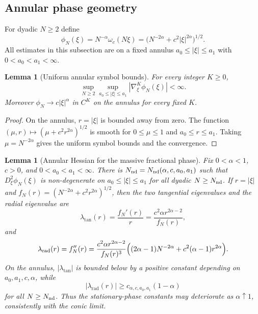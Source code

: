 \documentclass[10pt]{amsart}
\numberwithin{equation}{section}
\theoremstyle{plain}
\newtheorem{lemma}[theorem]{Lemma}
\theoremstyle{definition}
\theoremstyle{remark}
\begin{document}
\subsection{Annular phase geometry}

For dyadic $N\ge2$ define
\begin{equation}\label{eq:fracKG-rescaled-phase}
        \phi_N(\xi)=N^{-\alpha}\omega_c(N\xi)
        =\bigl(N^{-2\alpha}+c^2|\xi|^{2\alpha}\bigr)^{1/2}.
\end{equation}
All estimates in this subsection are on a fixed annulus $a_0\le |\xi|\le a_1$ with $0<a_0<a_1<\infty$.

\begin{lemma}[Uniform annular symbol bounds]\label{lem:fracKG-symbol-bounds}
For every integer $K\ge0$,
\[
        \sup_{N\ge2}\sup_{a_0\le |\xi|\le a_1}
        |\nabla_\xi^K\phi_N(\xi)|<\infty.
\]
Moreover $\phi_N\to c|\xi|^\alpha$ in $C^K$ on the annulus for every fixed $K$.
\end{lemma}

\begin{proof}
On the annulus, $r=|\xi|$ is bounded away from zero.  The function $(\mu,r)\mapsto(\mu+c^2r^{2\alpha})^{1/2}$ is smooth for $0\le\mu\le1$ and $a_0\le r\le a_1$.  Taking $\mu=N^{-2\alpha}$ gives the uniform symbol bounds and the convergence.
\end{proof}

\begin{lemma}[Annular Hessian for the massive fractional phase]\label{lem:fracKG-hessian}
Fix $0<\alpha<1$, $c>0$, and $0<a_0<a_1<\infty$.  There is $N_{\rm nd}=N_{\rm nd}(\alpha,c,a_0,a_1)$ such that $D^2_\xi\phi_N(\xi)$ is non-degenerate on $a_0\le |\xi|\le a_1$ for all dyadic $N\ge N_{\rm nd}$.  If $r=|\xi|$ and $f_N(r)=(N^{-2\alpha}+c^2r^{2\alpha})^{1/2}$, then the two tangential eigenvalues and the radial eigenvalue are
\[
        \lambda_{\mathrm{tan}}(r)=\frac{f_N'(r)}{r}
        =\frac{c^2\alpha r^{2\alpha-2}}{f_N(r)},
\]
and
\[
        \lambda_{\mathrm{rad}}(r)=f_N''(r)
        =\frac{c^2\alpha r^{2\alpha-2}}{f_N(r)^3}
        \Bigl((2\alpha-1)N^{-2\alpha}+c^2(\alpha-1)r^{2\alpha}\Bigr).
\]
On the annulus, $|\lambda_{\mathrm{tan}}|$ is bounded below by a positive constant depending on $a_0,a_1,c,\alpha$, while
\[
        |\lambda_{\mathrm{rad}}(r)|
        \ge c_{\alpha,c,a_0,a_1}(1-\alpha)
\]
for all $N\ge N_{\rm nd}$.  Thus the stationary-phase constants may deteriorate as $\alpha\uparrow 1$, consistently with the conic limit.
\end{lemma}
\end{document}
